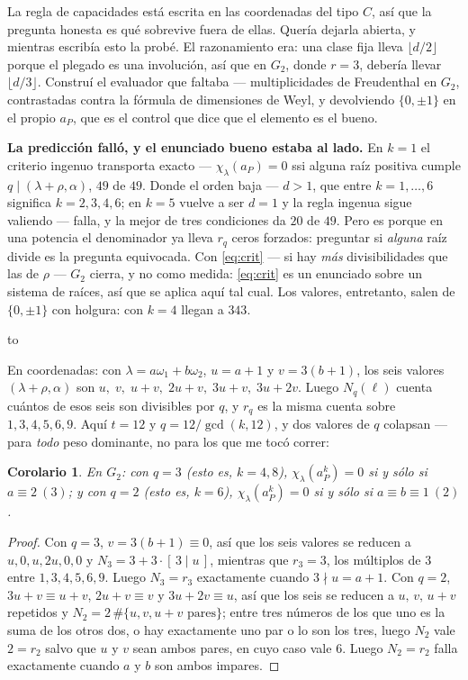 \documentclass[11pt,a4paper]{article}
\newtheorem{corollary}[theorem]{Corolario}
\newenvironment{keybox}
  {\par\vspace{9pt}\begin{lrbox}{\fichabox}%
   \begin{minipage}{0.90\textwidth}\vspace{7pt}\setlength{\parskip}{3pt}}
  {\vspace{7pt}\end{minipage}\end{lrbox}%
   \par\noindent\hbox to \textwidth{\hfill
   \textcolor{azul}{\rule[-\dp\fichabox]{3.2pt}{\dimexpr\ht\fichabox+\dp\fichabox\relax}}%
   \colorbox{fondoficha}{\usebox{\fichabox}}\hfill}%
   \par\vspace{9pt}}
\begin{document}
La regla de capacidades está escrita en las coordenadas del tipo $C$, así que la pregunta honesta
es qué sobrevive fuera de ellas. Quería dejarla abierta, y mientras escribía esto la probé. El
razonamiento era: una clase fija lleva $\lfloor d/2\rfloor$ porque el plegado es una involución, así
que en $G_2$, donde $r=3$, debería llevar $\lfloor d/3\rfloor$. Construí el evaluador que faltaba ---
multiplicidades de Freudenthal en $G_2$, contrastadas contra la fórmula de dimensiones de Weyl, y
devolviendo $\{0,\pm1\}$ en el propio $a_P$, que es el control que dice que el elemento es el bueno.

\begin{keybox}
\textbf{La predicción falló, y el enunciado bueno estaba al lado.} En $k=1$ el criterio ingenuo
transporta exacto --- $\chi_\lambda(a_P)=0$ ssi alguna raíz positiva cumple
$q\mid(\lambda+\rho,\alpha)$, $49$ de $49$. Donde el orden baja --- $d>1$, que entre $k=1,\dots,6$
significa $k=2,3,4,6$; en $k=5$ vuelve a ser $d=1$ y la regla ingenua sigue valiendo --- falla, y la
mejor de tres condiciones da $20$ de $49$. Pero es porque en una potencia el denominador ya lleva $r_q$ ceros forzados: preguntar si
\emph{alguna} raíz divide es la pregunta equivocada. Con \eqref{eq:crit} --- si hay \emph{más}
divisibilidades que las de $\rho$ --- $G_2$ cierra, y no como medida: \eqref{eq:crit} es un
enunciado sobre un sistema de raíces, así que se aplica aquí tal cual. Los valores, entretanto,
salen de $\{0,\pm1\}$ con holgura: con $k=4$ llegan a $343$.
\end{keybox}

\noindent En coordenadas: con $\lambda=a\omega_1+b\omega_2$, $u=a+1$ y $v=3(b+1)$, los seis valores
$(\lambda+\rho,\alpha)$ son $u,\;v,\;u+v,\;2u+v,\;3u+v,\;3u+2v$. Luego $N_q(\ell)$ cuenta cuántos
de esos seis son divisibles por $q$, y $r_q$ es la misma cuenta sobre $1,3,4,5,6,9$. Aquí $t=12$ y
$q=12/\gcd(k,12)$, y dos valores de $q$ colapsan --- para \emph{todo} peso dominante, no para los
que me tocó correr:

\begin{corollary}\label{cor:g2}
En $G_2$: con $q=3$ (esto es, $k=4,8$), $\chi_\lambda(a_P^k)=0$ si y sólo si $a\equiv2\ (3)$; y con
$q=2$ (esto es, $k=6$), $\chi_\lambda(a_P^k)=0$ si y sólo si $a\equiv b\equiv1\ (2)$.
\end{corollary}

\begin{proof}
Con $q=3$, $v=3(b+1)\equiv0$, así que los seis valores se reducen a $u,0,u,2u,0,0$ y
$N_3=3+3\cdot[\,3\mid u\,]$, mientras que $r_3=3$, los múltiplos de $3$ entre $1,3,4,5,6,9$. Luego
$N_3=r_3$ exactamente cuando $3\nmid u=a+1$. Con $q=2$, $3u+v\equiv u+v$, $2u+v\equiv v$ y
$3u+2v\equiv u$, así que los seis se reducen a $u,\,v,\,u+v$ repetidos y
$N_2=2\,\#\{u,v,u+v \text{ pares}\}$; entre tres números de los que uno es la suma de los otros dos,
o hay exactamente uno par o lo son los tres, luego $N_2$ vale $2=r_2$ salvo que $u$ y $v$ sean ambos
pares, en cuyo caso vale $6$. Luego $N_2=r_2$ falla exactamente cuando $a$ y $b$ son ambos impares.
\end{proof}
\end{document}
